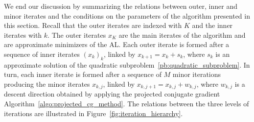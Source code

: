 \documentclass[pdflatex,sn-mathphys-num]{sn-jnl}%
\theoremstyle{thmstyleone}%
\begin{document}
We end our discussion by summarizing the relations between outer, inner and minor iterates and the conditions on the parameters of the algorithm presented in this section. Recall that the outer iterates are indexed with $K$ and the inner iterates with $k$.
The outer iterates $x_K$ are the main iterates of the algorithm and are approximate minimizers of the AL. Each outer iterate is formed after a sequence of inner iterates $(x_k)_k$, linked by $x_{k+1}=x_k+s_k$, where $s_k$ is an approximate solution of the quadratic subproblem~\eqref{pb:quadratic_subproblem}. In turn, each inner iterate is formed after a sequence of $M$ minor iterations producing the minor iterates $x_{k,j}$, linked by $x_{k,j+1}=x_{k,j}+w_{k,j}$, where $w_{k,j}$ is a descent direction obtained by applying the projected conjugate gradient Algorithm~\ref{algo:projected_cg_method}. 
The relations between the three levels of iterations are illustrated in Figure~\ref{fig:iteration_hierarchy}.
\end{document}
